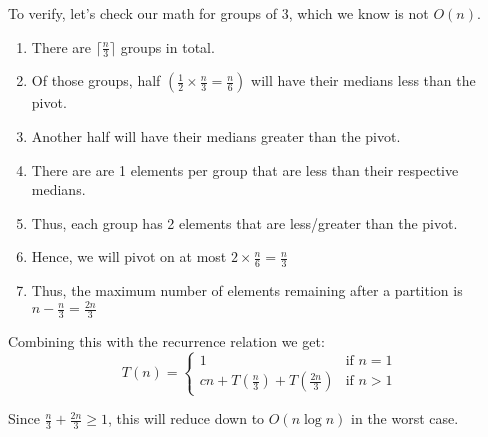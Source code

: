 \documentclass[a4paper,12pt]{article}
\begin{document}
To verify, let's check our math for groups of 3, which we know is not \(O(n)\).

\begin{enumerate}
    \item There are \(\lceil \frac{n}{3} \rceil\) groups in total.
    \item Of those groups, half \(\left( \frac{1}{2} \times \frac{n}{3} = \frac{n}{6}\right)\) will have their medians less than the pivot.
    \item Another half will have their medians greater than the pivot.
    \item There are are 1 elements per group that are less than their respective medians.
    \item Thus, each group has 2 elements that are less/greater than the pivot.
    \item Hence, we will pivot on at most \(2 \times \frac{n}{6} = \frac{n}{3}\)
    \item Thus, the maximum number of elements remaining after a partition is \(n - \frac{n}{3} = \frac{2n}{3}\)
\end{enumerate}

Combining this with the recurrence relation we get:
\begin{equation*}
    T(n) = \begin{cases}
        1                                                           & \text{if } n = 1 \\
        cn + T\left(\frac{n}{3}\right) + T\left(\frac{2n}{3}\right) & \text{if } n > 1
    \end{cases}
\end{equation*}

Since \(\frac{n}{3} + \frac{2n}{3} \geq 1\), this will reduce down to \(O(n \log n)\) in the worst case.
\end{document}
